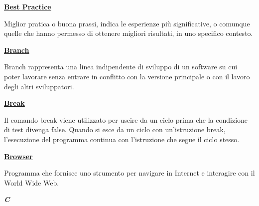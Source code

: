 \vspace*{2\bigskipamount}

\begin{addmargin}[0em]{0em}
	\textbf{\underline{Best Practice}} 
\end{addmargin}
	
\medskip
\begin{addmargin}[5em]{1em}
Miglior pratica o buona prassi, indica le esperienze più significative, o comunque quelle che hanno permesso di ottenere migliori risultati, in uno specifico contesto.
\end{addmargin}

\bigskip

\begin{addmargin}[0em]{0em}
	\textbf{\underline{Branch}} 
\end{addmargin}
	
\medskip
\begin{addmargin}[5em]{1em}
Branch rappresenta una linea indipendente di sviluppo di un software su cui poter lavorare 
senza entrare in conflitto con la versione principale o con il lavoro degli altri sviluppatori.
\end{addmargin}

\bigskip
\begin{addmargin}[0em]{0em}	
	\textbf{\underline{Break}}
\end{addmargin}
	
\medskip
\begin{addmargin}[5em]{1em}	
Il comando break viene utilizzato per uscire da un ciclo prima che la condizione di test divenga false. Quando si esce da un ciclo con un’istruzione break, l’esecuzione del programma continua con l’istruzione che segue il ciclo stesso.
\end{addmargin}

\bigskip
\begin{addmargin}[0em]{0em}	
	\textbf{\underline{Browser}}
\end{addmargin}
	
\medskip
\begin{addmargin}[5em]{1em}	
Programma che fornisce uno strumento per navigare in Internet e interagire con il World Wide Web.
\end{addmargin}

\newpage

\cleardoublepage
{}
{}
\noindent\hrulefill\hspace{4mm}\textbf{\textsl{\Huge{C}}}\hspace{4mm}\hrulefill

